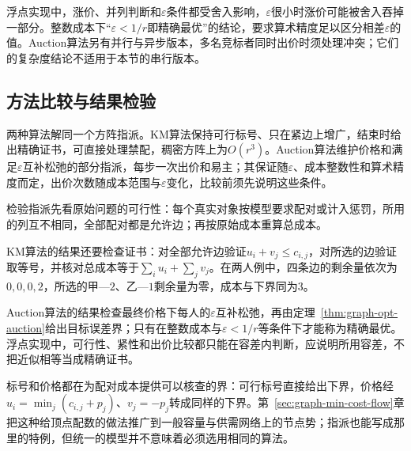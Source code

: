 浮点实现中，涨价、并列判断和$\varepsilon$条件都受舍入影响，$\varepsilon$很小时涨价可能被舍入吞掉一部分。整数成本下“$\varepsilon<1/r$即精确最优”的结论，要求算术精度足以区分相差$\varepsilon$的值。Auction算法另有并行与异步版本，多名竞标者同时出价时须处理冲突；它们的复杂度结论不适用于本节的串行版本。

\subsection{方法比较与结果检验}
\label{sec:graph-opt-assign-analysis}

两种算法解同一个方阵指派。KM算法保持可行标号、只在紧边上增广，结束时给出精确证书，可直接处理禁配，稠密方阵上为$O(r^3)$。Auction算法维护价格和满足$\varepsilon$互补松弛的部分指派，每步一次出价和易主；其保证随$\varepsilon$、成本整数性和算术精度而定，出价次数随成本范围与$\varepsilon$变化，比较前须先说明这些条件。

检验指派先看原始问题的可行性：每个真实对象按模型要求配对或计入惩罚，所用的列互不相同，全部配对都是允许边；再按原始成本重算总成本。

KM算法的结果还要检查证书：对全部允许边验证$u_i+v_j\leq c_{i,j}$，对所选的边验证取等号，并核对总成本等于$\sum_iu_i+\sum_jv_j$。在两人例中，四条边的剩余量依次为$0,0,0,2$，所选的甲—$2$、乙—$1$剩余量为零，成本与下界同为$3$。

Auction算法的结果检查最终价格下每人的$\varepsilon$互补松弛，再由定理~\ref{thm:graph-opt-auction}给出目标误差界；只有在整数成本与$\varepsilon<1/r$等条件下才能称为精确最优。浮点实现中，可行性、紧性和出价比较都只能在容差内判断，应说明所用容差，不把近似相等当成精确证书。

标号和价格都在为配对成本提供可以核查的界：可行标号直接给出下界，价格经$u_i=\min_j(c_{i,j}+p_j)$、$v_j=-p_j$转成同样的下界。第~\ref{sec:graph-min-cost-flow}章把这种给顶点配数的做法推广到一般容量与供需网络上的节点势；指派也能写成那里的特例，但统一的模型并不意味着必须选用相同的算法。
